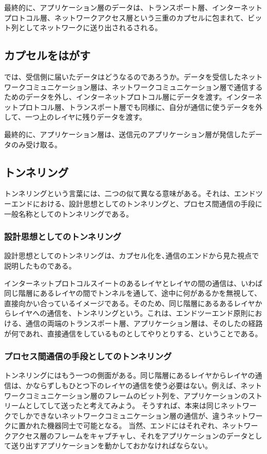 最終的に、アプリケーション層のデータは、トランスポート層、インターネットプロトコル層、ネットワークアクセス層という三重のカプセルに包まれて、ビット列としてネットワークに送り出されるされる。

\subsection{カプセルをはがす}
では、受信側に届いたデータはどうなるのであろうか。データを受信したネットワークコミュニケーション層は、ネットワークコミュニケーション層で通信するためのデータを外し、インターネットプロトコル層にデータを渡す。インターネットプロトコル層、トランスポート層でも同様に、自分が通信に使うデータを外して、一つ上のレイヤに残りデータを渡す。

最終的に、アプリケーション層は、送信元のアプリケーション層が発信したデータのみ受け取る。

\subsection{トンネリング}
トンネリングという言葉には、二つの似て異なる意味がある。それは、エンドツーエンドにおける、設計思想としてのトンネリングと、プロセス間通信の手段に一般名称としてのトンネリングである。

\subsubsection{設計思想としてのトンネリング}

設計思想としてのトンネリングは、カプセル化を､通信のエンドから見た視点で説明したものである。

インターネットプロトコルスイートのあるレイヤとレイヤの間の通信は、いわば同じ階層にあるレイヤの間でトンネルを通して、途中に何があるかを無視して、直接向かい合っているイメージである。そのため、同じ階層にあるあるレイヤからレイヤへの通信を、トンネリングという。これは、エンドツーエンド原則における、通信の両端のトランスポート層、アプリケーション層は、そのしたの経路が何であれ、直接通信をしているものとしてやりとりする、ということである。


\subsubsection{プロセス間通信の手段としてのトンネリング}

トンネリングにはもう一つの側面がある。同じ階層にあるレイヤからレイヤの通信は、かならずしもひとつ下のレイヤの通信を使う必要はない。例えば、ネットワークコミュニケーション層のフレームのビット列を、アプリケーションのストリームとしてして送ったと考えてみよう。
そうすれば、本来は同じネットワークでしかできないネットワークコミュニケーション層の通信が、違うネットワークに置かれた機器同士で可能となる。
当然、エンドにはそれぞれ、ネットワークアクセス層のフレームをキャプチャし、それをアプリケーションのデータとして送り出すアプリケーションを動かしておかなければならない。

